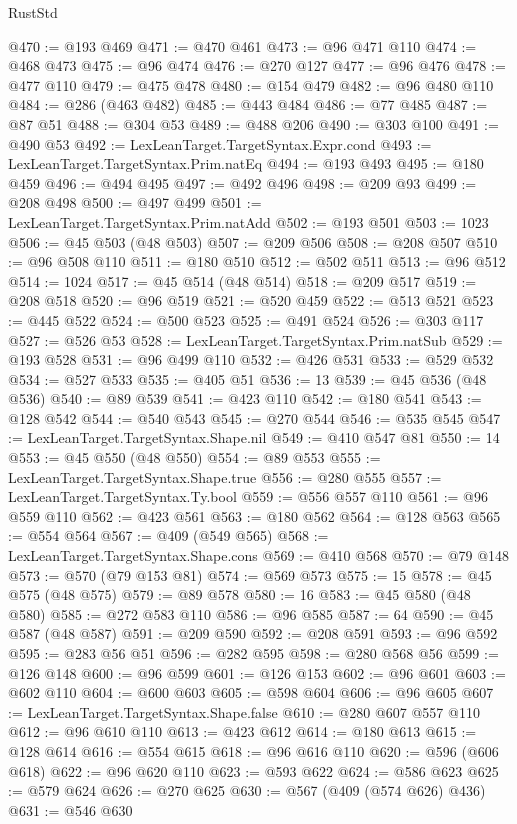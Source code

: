 \begin{lexlean}{RustStd}
\begin{coremodule}
{\begin{coremodule}
{{{{{{{{{{{{{{{{{{{{{{{{{{{{{{{{{{{{{{{{{{{{{{{{{{{{{{{{{{{{@470 := @193 @469
@471 := @470 @461
@473 := @96 @471 @110
@474 := @468 @473
@475 := @96 @474
@476 := @270 @127
@477 := @96 @476
@478 := @477 @110
@479 := @475 @478
@480 := @154 @479
@482 := @96 @480 @110
@484 := @286 (@463 @482)
@485 := @443 @484
@486 := @77 @485
@487 := @87 @51
@488 := @304 @53
@489 := @488 @206
@490 := @303 @100
@491 := @490 @53
@492 := LexLeanTarget.TargetSyntax.Expr.cond
@493 := LexLeanTarget.TargetSyntax.Prim.natEq
@494 := @193 @493
@495 := @180 @459
@496 := @494 @495
@497 := @492 @496
@498 := @209 @93
@499 := @208 @498
@500 := @497 @499
@501 := LexLeanTarget.TargetSyntax.Prim.natAdd
@502 := @193 @501
@503 := 1023
@506 := @45 @503 (@48 @503)
@507 := @209 @506
@508 := @208 @507
@510 := @96 @508 @110
@511 := @180 @510
@512 := @502 @511
@513 := @96 @512
@514 := 1024
@517 := @45 @514 (@48 @514)
@518 := @209 @517
@519 := @208 @518
@520 := @96 @519
@521 := @520 @459
@522 := @513 @521
@523 := @445 @522
@524 := @500 @523
@525 := @491 @524
@526 := @303 @117
@527 := @526 @53
@528 := LexLeanTarget.TargetSyntax.Prim.natSub
@529 := @193 @528
@531 := @96 @499 @110
@532 := @426 @531
@533 := @529 @532
@534 := @527 @533
@535 := @405 @51
@536 := 13
@539 := @45 @536 (@48 @536)
@540 := @89 @539
@541 := @423 @110
@542 := @180 @541
@543 := @128 @542
@544 := @540 @543
@545 := @270 @544
@546 := @535 @545
@547 := LexLeanTarget.TargetSyntax.Shape.nil
@549 := @410 @547 @81
@550 := 14
@553 := @45 @550 (@48 @550)
@554 := @89 @553
@555 := LexLeanTarget.TargetSyntax.Shape.true
@556 := @280 @555
@557 := LexLeanTarget.TargetSyntax.Ty.bool
@559 := @556 @557 @110
@561 := @96 @559 @110
@562 := @423 @561
@563 := @180 @562
@564 := @128 @563
@565 := @554 @564
@567 := @409 (@549 @565)
@568 := LexLeanTarget.TargetSyntax.Shape.cons
@569 := @410 @568
@570 := @79 @148
@573 := @570 (@79 @153 @81)
@574 := @569 @573
@575 := 15
@578 := @45 @575 (@48 @575)
@579 := @89 @578
@580 := 16
@583 := @45 @580 (@48 @580)
@585 := @272 @583 @110
@586 := @96 @585
@587 := 64
@590 := @45 @587 (@48 @587)
@591 := @209 @590
@592 := @208 @591
@593 := @96 @592
@595 := @283 @56 @51
@596 := @282 @595
@598 := @280 @568 @56
@599 := @126 @148
@600 := @96 @599
@601 := @126 @153
@602 := @96 @601
@603 := @602 @110
@604 := @600 @603
@605 := @598 @604
@606 := @96 @605
@607 := LexLeanTarget.TargetSyntax.Shape.false
@610 := @280 @607 @557 @110
@612 := @96 @610 @110
@613 := @423 @612
@614 := @180 @613
@615 := @128 @614
@616 := @554 @615
@618 := @96 @616 @110
@620 := @596 (@606 @618)
@622 := @96 @620 @110
@623 := @593 @622
@624 := @586 @623
@625 := @579 @624
@626 := @270 @625
@630 := @567 (@409 (@574 @626) @436)
@631 := @546 @630
}}}}}}}}}}}}}}}}}}}}}}}}}}}}}}}}}}}}}}}}}}}}}}}}}}}}}}}}}}}}
\end{coremodule}}
\end{coremodule}
\end{lexlean}
